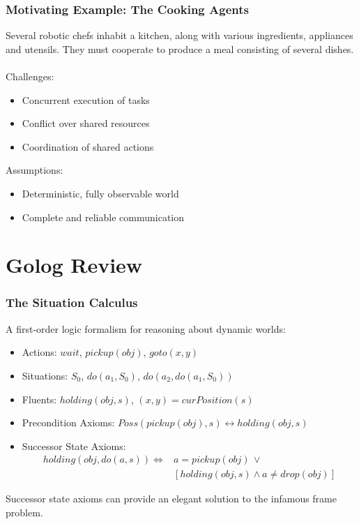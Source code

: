 \documentclass{beamer}
\begin{document}
\begin{frame}
\frametitle{Motivating Example: The Cooking Agents}
Several robotic chefs inhabit a kitchen, along with various ingredients,
appliances and utensils.  They must cooperate to produce a meal consisting
of several dishes.\\
\ \\
Challenges:
\begin{itemize}
  \item Concurrent execution of tasks
  \item Conflict over shared resources
  \item Coordination of shared actions
\end{itemize}

Assumptions:
\begin{itemize}
  \item Deterministic, fully observable world
  \item Complete and reliable communication
\end{itemize}
\end{frame}


\section{Golog Review}

\begin{frame}
\frametitle{The Situation Calculus}

A first-order logic formalism for reasoning about dynamic worlds:

\begin{itemize}
\pause
\item Actions: $wait$, $pickup(obj)$, $goto(x,y)$
\pause
\item Situations: $S_{0}$, $do(a_{1},S_{0})$, $do(a_{2},do(a_{1},S_{0}))$
\pause
\item Fluents: $holding(obj,s)$, $(x,y)=curPosition(s)$
\pause
\item Precondition Axioms: $Poss(pickup(obj),s) \leftrightarrow holding(obj,s)$
\pause
\item Successor State Axioms:\[
\begin{array}{cc}
holding(obj,do(a,s))\iff & a=pickup(obj)\,\vee\\
 & \left[holding(obj,s)\wedge a\neq drop(obj)\right]\end{array}\]
\end{itemize}
\pause
Successor state axioms can provide an elegant solution to the infamous
frame problem.

\end{frame}
\end{document}
